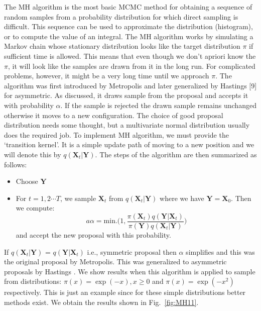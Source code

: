 \documentclass[letter,11pt]{article}
\begin{document}
The MH algorithm is the most basic MCMC method for obtaining a sequence
of random samples from a probability distribution for which direct sampling is difficult. This
sequence can be used to approximate the distribution (histogram), or to compute the value of an integral. 
The MH algorithm works by simulating a Markov chain whose stationary distribution looks like the 
target distribution $\pi$ if sufficient time is allowed. This means that even though we don't apriori know
the $\pi$, it will look like the samples are drawn from it in the long run. For complicated problems,
however, it might be a very long time until we approach $\pi$. The algorithm was first introduced by Metropolis \cite{Metropolis:1953am}
and later generalized by Hastings [9] for asymmetric. As discussed, it draws sample from the proposal and accepts it with probability 
$\alpha$. If the sample is rejected the drawn sample remains unchanged otherwise it moves to a new configuration. 
The choice of good proposal distribution needs some thought, but a multivariate normal 
distribution usually does the required job. To implement MH algorithm, we must provide the `transition kernel'. It is a simple
update path of moving to a new position and we will denote this by $q(\textbf{X}_{t}\vert \textbf{Y})$. The steps of the 
algorithm are then summarized as follows:

\begin{itemize}
\item Choose $\textbf{Y}$
\item For $t=1,2 \cdots T$, we sample $\textbf{X}_{t}$ from $q(\textbf{X}_{t}\vert \textbf{Y})$ where we have $\textbf{Y} = \textbf{X}_{0}$. Then we compute:
\begin{equation}a
\alpha = \text{min.} \Bigg(1, \frac{\pi(\textbf{X}_{t}) q(\textbf{Y} \vert \textbf{X}_{t})} {\pi(\textbf{Y}) q(\textbf{X}_{t}\vert \textbf{Y})} \Bigg) 
\end{equation}
and accept the new proposal with this probability. 
\end{itemize}
If $q(\textbf{X}_{t}\vert \textbf{Y})$ = $q(\textbf{Y} \vert \textbf{X}_{t})$ i.e., symmetric proposal then $\alpha$ simplifies and this was 
the original proposal by Metropolis. This was generalized to asymmetric proposals by Hastings \cite{10.1093/biomet/57.1.97}. 
We show results when this algorithm is applied to sample from distributions: $\pi(x) = \exp(-x), x \ge 0$ and 
$\pi(x) = \exp(-x^2)$ respectively. This is just an example since for these simple distributions 
better methods exist. We obtain the results shown in Fig.~\ref{fig:MH11}.
\end{document}
